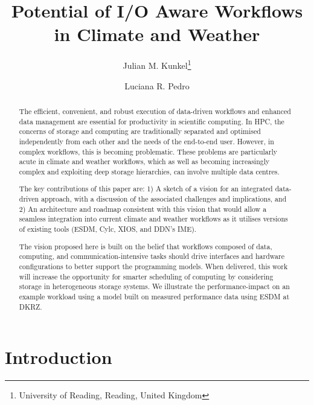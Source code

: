 \documentclass{superfri}
\begin{document}
\author{Julian M. Kunkel\footnote{\label{uread}University of Reading, Reading, United Kingdom} \and Luciana R. Pedro
}

\title{Potential of I/O Aware Workflows in Climate and Weather}

\maketitle{}

\begin{abstract}
The efficient, convenient, and robust execution of data-driven workflows and enhanced data management are essential for productivity in scientific computing.
In HPC, the concerns of storage and computing are traditionally separated and optimised independently from each other and the needs of the end-to-end user. However, in complex workflows, this is becoming problematic. These problems are particularly acute in climate and weather workflows, which as well as becoming increasingly complex and exploiting deep storage hierarchies, can involve multiple data centres.

The key contributions of this paper are:
1) A sketch of a vision for an integrated data-driven approach, with a discussion of the associated challenges and implications, and 2) An architecture and roadmap consistent with this vision that would allow a seamless integration into current climate and weather workflows as it utilises versions of existing tools (ESDM, Cylc, XIOS, and DDN's IME).

The vision proposed here is built on the belief that workflows composed of data, computing, and communication-intensive tasks should drive interfaces and hardware configurations to better support the programming models.
When delivered, this work will increase the opportunity for smarter scheduling of computing by considering storage in heterogeneous storage systems.
We illustrate the performance-impact on an example workload using a model built on measured performance data using ESDM at DKRZ.

\end{abstract}


\section*{Introduction}
\label{sec:intro}
\end{document}
